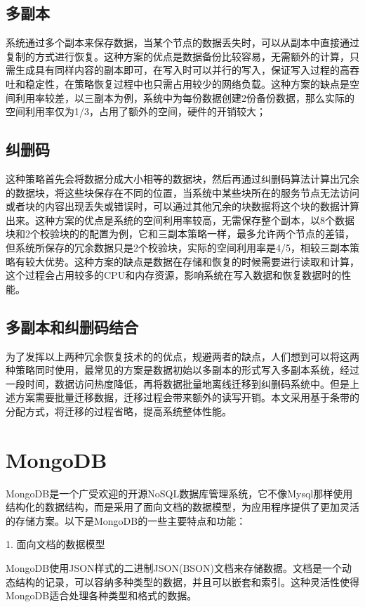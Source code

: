 \subsection{多副本}%
系统通过多个副本来保存数据，当某个节点的数据丢失时，可以从副本中直接通过复制的方式进行恢复。这种方案的优点是数据备份比较容易，无需额外的计算，只需生成具有同样内容的副本即可，在写入时可以并行的写入，保证写入过程的高吞吐和稳定性，在策略恢复过程中也只需占用较少的网络负载。这种方案的缺点是空间利用率较差，以三副本为例，系统中为每份数据创建2份备份数据，那么实际的空间利用率仅为1/3，占用了额外的空间，硬件的开销较大；

\subsection{纠删码}%
这种策略首先会将数据分成大小相等的数据块，然后再通过纠删码算法计算出冗余的数据块，将这些块保存在不同的位置，当系统中某些块所在的服务节点无法访问或者块的内容出现丢失或错误时，可以通过其他冗余的块数据将这个块的数据计算出来。这种方案的优点是系统的空间利用率较高，无需保存整个副本，以8个数据块和2个校验块的的配置为例，它和三副本策略一样，最多允许两个节点的差错，但系统所保存的冗余数据只是2个校验块，实际的空间利用率是4/5，相较三副本策略有较大优势。这种方案的缺点是数据在存储和恢复的时候需要进行读取和计算，这个过程会占用较多的CPU和内存资源，影响系统在写入数据和恢复数据时的性能。

\subsection{多副本和纠删码结合}%
为了发挥以上两种冗余恢复技术的的优点，规避两者的缺点，人们想到可以将这两种策略同时使用，最常见的方案是数据初始以多副本的形式写入多副本系统，经过一段时间，数据访问热度降低，再将数据批量地离线迁移到纠删码系统中。但是上述方案需要批量迁移数据，迁移过程会带来额外的读写开销。本文采用基于条带的分配方式，将迁移的过程省略，提高系统整体性能。

\section{MongoDB}%
MongoDB是一个广受欢迎的开源NoSQL数据库管理系统，它不像Mysql那样使用结构化的数据结构，而是采用了面向文档的数据模型，为应用程序提供了更加灵活的存储方案。以下是MongoDB的一些主要特点和功能：

1. 面向文档的数据模型

MongoDB使用JSON样式的二进制JSON(BSON)文档来存储数据。文档是一个动态结构的记录，可以容纳多种类型的数据，并且可以嵌套和索引。这种灵活性使得MongoDB适合处理各种类型和格式的数据。

